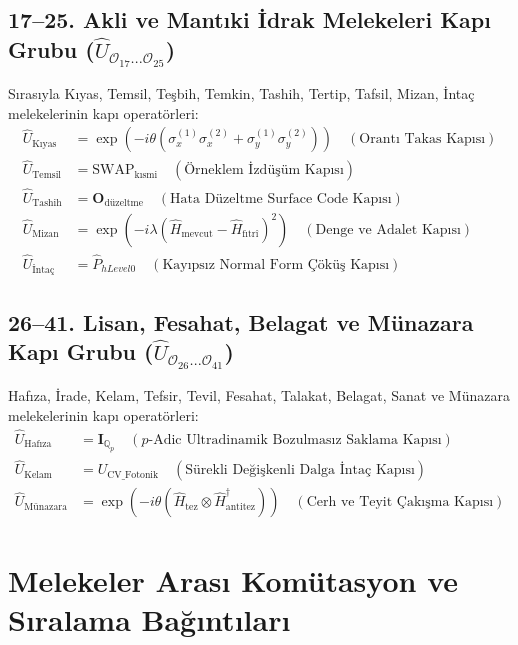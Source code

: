 \documentclass[11pt, a4paper]{article}
\begin{document}
\subsection{17--25. Akli ve Mantıki İdrak Melekeleri Kapı Grubu ($\hat{U}_{\mathcal{O}_{17} \dots \mathcal{O}_{25}}$)}
Sırasıyla Kıyas, Temsil, Teşbih, Temkin, Tashih, Tertip, Tafsil, Mizan, İntaç melekelerinin kapı operatörleri:
\begin{align}
\hat{U}_{\text{Kıyas}} &= \exp\left(-i \theta (\sigma_x^{(1)} \sigma_x^{(2)} + \sigma_y^{(1)} \sigma_y^{(2)})\right) \quad (\text{Orantı Takas Kapısı}) \\
\hat{U}_{\text{Temsil}} &= \text{SWAP}_{\text{kısmi}} \quad (\text{Örneklem İzdüşüm Kapısı}) \\
\hat{U}_{\text{Tashih}} &= \mathbf{O}_{\text{düzeltme}} \quad (\text{Hata Düzeltme Surface Code Kapısı}) \\
\hat{U}_{\text{Mizan}} &= \exp\left( -i \lambda (\hat{H}_{\text{mevcut}} - \hat{H}_{\text{fıtrî}})^2 \right) \quad (\text{Denge ve Adalet Kapısı}) \\
\hat{U}_{\text{İntaç}} &= \hat{P}_{hLevel 0} \quad (\text{Kayıpsız Normal Form Çöküş Kapısı})
\end{align}

\subsection{26--41. Lisan, Fesahat, Belagat ve Münazara Kapı Grubu ($\hat{U}_{\mathcal{O}_{26} \dots \mathcal{O}_{41}}$)}
Hafıza, İrade, Kelam, Tefsir, Tevil, Fesahat, Talakat, Belagat, Sanat ve Münazara melekelerinin kapı operatörleri:
\begin{align}
\hat{U}_{\text{Hafıza}} &= \mathbf{I}_{\mathbb{Q}_p} \quad (\text{$p$-Adic Ultradinamik Bozulmasız Saklama Kapısı}) \\
\hat{U}_{\text{Kelam}} &= U_{\text{CV\_Fotonik}} \quad (\text{Sürekli Değişkenli Dalga İntaç Kapısı}) \\
\hat{U}_{\text{Münazara}} &= \exp\left( -i \theta (\hat{H}_{\text{tez}} \otimes \hat{H}_{\text{antitez}}^\dagger) \right) \quad (\text{Cerh ve Teyit Çakışma Kapısı})
\end{align}

\section{Melekeler Arası Komütasyon ve Sıralama Bağıntıları}
\end{document}
